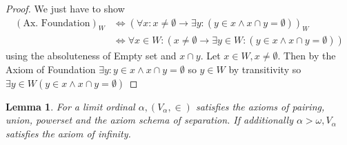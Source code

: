 \documentclass{scrartcl}
\theoremstyle{definition}
\theoremstyle{plain}
\newtheorem*{lemma*}{Lemma}
\theoremstyle{remark}
\begin{document}
	\begin{proof}
		We just have to show 
		\begin{align*}
			(\text{Ax. Foundation})_W &\iff (\forall x: x \neq \emptyset \longrightarrow \exists y: (y \in x \land x \cap y = \emptyset))_W\\
			&\iff \forall x \in W: (x \neq \emptyset \longrightarrow \exists y \in W: (y \in x \land x \cap y = \emptyset))
		\end{align*}
		using the absoluteness of Empty set and $x \cap y$. Let $x \in W, x \neq \emptyset$. Then by the Axiom of Foundation $\exists y: y \in x \land x \cap y = \emptyset$ so $y \in W$ by transitivity so $\exists y \in W(y \in x \land x \cap y = \emptyset)$
	\end{proof}

	\begin{lemma*}
		For a limit ordinal $\alpha, (V_\alpha, \in)$ satisfies the axioms of pairing, union, powerset and the axiom schema of separation. If additionally $\alpha > \omega, V_\alpha$ satisfies the axiom of infinity.
	\end{lemma*}
\end{document}
